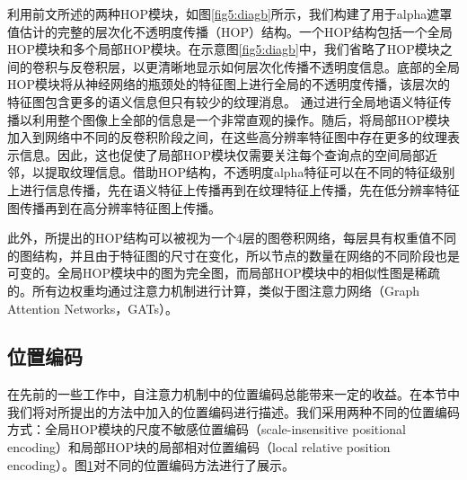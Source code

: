 利用前文所述的两种HOP模块，如图\ref{fig5:diagb}所示，我们构建了用于alpha遮罩值估计的完整的层次化不透明度传播（HOP）结构。一个HOP结构包括一个全局HOP模块和多个局部HOP模块。在示意图\ref{fig5:diagb}中，我们省略了HOP模块之间的卷积与反卷积层，以更清晰地显示如何层次化传播不透明度信息。底部的全局HOP模块将从神经网络的瓶颈处的特征图上进行全局的不透明度传播，该层次的特征图包含更多的语义信息但只有较少的纹理消息。
通过进行全局地语义特征传播以利用整个图像上全部的信息是一个非常直观的操作。随后，将局部HOP模块加入到网络中不同的反卷积阶段之间，在这些高分辨率特征图中存在更多的纹理表示信息。因此，这也促使了局部HOP模块仅需要关注每个查询点的空间局部近邻，以提取纹理信息。借助HOP结构，不透明度alpha特征可以在不同的特征级别上进行信息传播，先在语义特征上传播再到在纹理特征上传播，先在低分辨率特征图传播再到在高分辨率特征图上传播。

此外，所提出的HOP结构可以被视为一个4层的图卷积网络\cite{kipf2016semi}，每层具有权重值不同的图结构，并且由于特征图的尺寸在变化，所以节点的数量在网络的不同阶段也是可变的。全局HOP模块中的图为完全图，而局部HOP模块中的相似性图是稀疏的。所有边权重均通过注意力机制进行计算，类似于图注意力网络（Graph Attention Networks，GATs）\cite{velivckovic2017graph}。

\subsection{位置编码}
在先前的一些工作中，自注意力机制中的位置编码总能带来一定的收益\cite{vaswani2017attention,dai2019transformer,ramachandran2019stand}。在本节中我们将对所提出的方法中加入的位置编码进行描述。我们采用两种不同的位置编码方式：全局HOP模块的尺度不敏感位置编码（scale-insensitive positional encoding）和局部HOP块的局部相对位置编码（local relative position encoding）。图\ref{fig5:PE}对不同的位置编码方法进行了展示。

\begin{figure}[t]

	\label{fig5:PE}
\end{figure}

